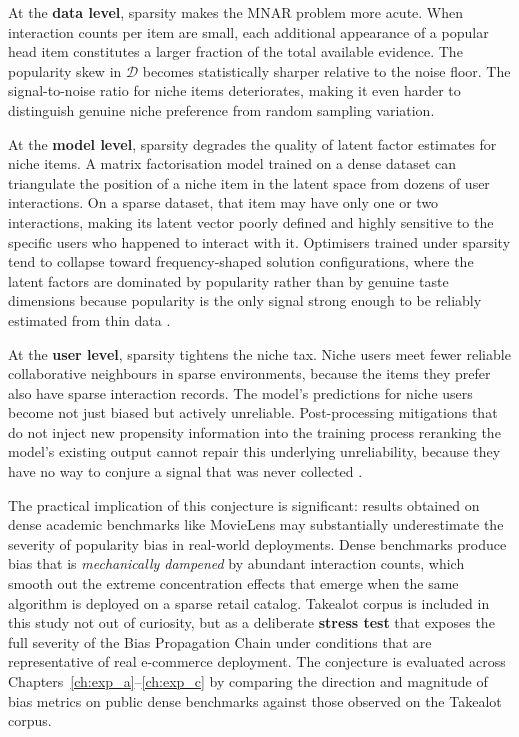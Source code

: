 \documentclass[11pt,a4paper]{report}
\begin{document}
At the \textbf{data level}, sparsity makes the MNAR problem more acute. When interaction counts per item are small, each additional appearance of a popular head item constitutes a larger fraction of the total available evidence. The popularity skew in $\mathcal{D}$ becomes statistically sharper relative to the noise floor. The signal-to-noise ratio for niche items deteriorates, making it even harder to distinguish genuine niche preference from random sampling variation.

At the \textbf{model level}, sparsity degrades the quality of latent factor estimates for niche items. A matrix factorisation model trained on a dense dataset can triangulate the position of a niche item in the latent space from dozens of user interactions. On a sparse dataset, that item may have only one or two interactions, making its latent vector poorly defined and highly sensitive to the specific users who happened to interact with it. Optimisers trained under sparsity tend to collapse toward frequency-shaped solution configurations, where the latent factors are dominated by popularity rather than by genuine taste dimensions because popularity is the only signal strong enough to be reliably estimated from thin data \citep{steck2010training}.

At the \textbf{user level}, sparsity tightens the niche tax. Niche users meet fewer reliable collaborative neighbours in sparse environments, because the items they prefer also have sparse interaction records. The model's predictions for niche users become not just biased but actively unreliable. Post-processing mitigations that do not inject new propensity information into the training process reranking the model's existing output cannot repair this underlying unreliability, because they have no way to conjure a signal that was never collected \citep{abdollahpouri2019managing}.

The practical implication of this conjecture is significant: results obtained on dense academic benchmarks like MovieLens may substantially underestimate the severity of popularity bias in real-world deployments. Dense benchmarks produce bias that is \emph{mechanically dampened} by abundant interaction counts, which smooth out the extreme concentration effects that emerge when the same algorithm is deployed on a sparse retail catalog. Takealot corpus is included in this study not out of curiosity, but as a deliberate \textbf{stress test} that exposes the full severity of the Bias Propagation Chain under conditions that are representative of real e-commerce deployment. The conjecture is evaluated across Chapters~\ref{ch:exp_a}--\ref{ch:exp_c} by comparing the direction and magnitude of bias metrics on public dense benchmarks against those observed on the Takealot corpus.
\end{document}

